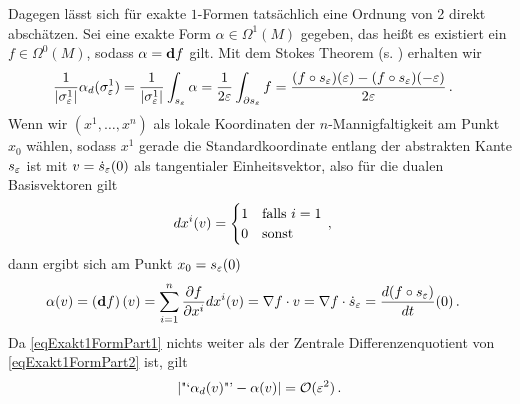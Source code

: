 \begin{bemerkung}
    Dagegen lässt sich für exakte \( 1 \)-Formen tatsächlich eine Ordnung von 2 direkt abschätzen.
    Sei eine exakte Form \( \alpha\in\Omega^{1}(M) \) gegeben, das heißt es existiert ein \( f\in\Omega^{0}(M) \), sodass \( \alpha= \mathbf{d} f \) gilt.
    Mit dem Stokes Theorem (s. \cite[Kap. 7.2]{Marsden}) erhalten wir
    \begin{align}
    \label{eqExakt1FormPart1}
      \frac{1}{|\sigma^{1}_{\varepsilon}|} \alpha_{d}(\sigma_{\varepsilon}^{1}) &= \frac{1}{|\sigma^{1}_{\varepsilon}|}\int_{s_{\varepsilon}}\alpha 
                                                                   = \frac{1}{2\varepsilon}\int_{\partial s_{\varepsilon}} f
                                                                   = \frac{(f\circ s_{\varepsilon})(\varepsilon) - (f\circ s_{\varepsilon})(-\varepsilon)}{2\varepsilon} \,\text{.}
    \end{align}
    Wenn wir \( \left( x^{1},\ldots,x^{n} \right) \) als lokale Koordinaten der \( n \)-Mannigfaltigkeit am Punkt \( x_{0} \) wählen, 
    sodass \( x^{1} \) gerade die Standardkoordinate entlang der abstrakten Kante \( s_{\varepsilon} \) ist mit \( v=\dot{s}_{\varepsilon}(0) \) als tangentialer Einheitsvektor,
    also für die dualen Basisvektoren gilt 
    \begin{align}
      dx^{i}(v) &= \begin{cases}
                      1 & \text{falls } i=1 \\
                      0 & \text{sonst}
                  \end{cases} \,\text{,}
    \end{align}
    dann ergibt sich am Punkt \( x_{0}= s_{\varepsilon}(0) \)
    \begin{align}
    \label{eqExakt1FormPart2}
      \begin{aligned}
        \alpha(v) &= \left( \mathbf{d} f \right)(v) = \sum_{i=1}^{n}\frac{\partial f}{\partial x^{i}} dx^{i}(v)
                   = \nabla f \cdot v
                   = \nabla f \cdot \dot{s}_{\varepsilon}
                   = \frac{d (f\circ s_{\varepsilon})}{dt}(0) \,\text{.}
      \end{aligned}
    \end{align}
    Da \eqref{eqExakt1FormPart1} nichts weiter als der Zentrale Differenzenquotient von \eqref{eqExakt1FormPart2} ist, gilt
    \begin{align}
      \left| \text{"`}\alpha_{d}(v)\text{"'} - \alpha(v) \right| = \mathcal{O}(\varepsilon^{2}) \,\text{.}
    \end{align}


\end{bemerkung}
